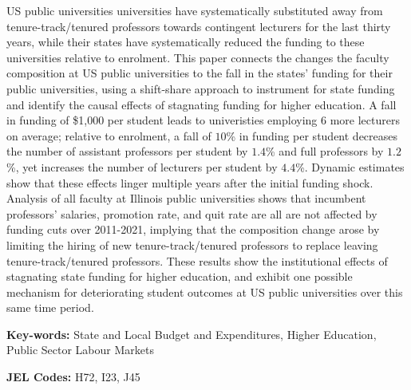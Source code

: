 US public universities universities have systematically substituted away from tenure-track/tenured professors towards contingent lecturers for the last thirty years, while their states have systematically reduced the funding to these universities relative to enrolment.
This paper connects the changes the faculty composition at US public universities to the fall in the states' funding for their public universities, using a shift-share approach to instrument for state funding and identify the causal effects of stagnating funding for higher education.
A fall in funding of \$1,000 per student leads to univeristies employing 6 more lecturers on average; relative to enrolment, a fall of $10$\% in funding per student decreases the number of assistant professors per student by $1.4$\% and full professors by $1.2$\%, yet increases the number of lecturers per student by $4.4$\%.
Dynamic estimates show that these effects linger multiple years after the initial funding shock.
Analysis of all faculty at Illinois public universities shows that incumbent professors' salaries, promotion rate, and quit rate are all are not affected by funding cuts over 2011-2021, implying that the composition change arose by limiting the hiring of new tenure-track/tenured professors to replace leaving tenure-track/tenured professors.
These results show the institutional effects of stagnating state funding for higher education, and exhibit one possible mechanism for deteriorating student outcomes at US public universities over this same time period.

\vfill
\noindent
\textbf{Key-words:}
State and Local Budget and Expenditures,
Higher Education,
Public Sector Labour Markets

\vspace{0.1cm}
\noindent
\textbf{JEL Codes:} H72, I23, J45
